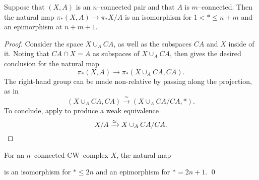 \begin{corollary}
Suppose that $(X, A)$ is an $n$--connected pair and that $A$ is $m$--connected.
Then the natural map $\pi_*(X, A) \to \pi_* X/A$ is an isomorphism for $1 < * \le n+m$ and an epimorphism at $n+m+1$.
\end{corollary}
\begin{proof}
Consider the space $X \cup_A CA$, as well as the subspaces $CA$ and $X$ inside of it.
Noting that $CA \cap X = A$ as subspaces of $X \cup_A CA$,  then gives the desired conclusion for the natural map \[\pi_*(X, A) \to \pi_*(X \cup_A CA, CA).\]
The right-hand group can be made non-relative by passing along the projection, as in \[(X \cup_A CA, CA) \xrightarrow\simeq (X \cup_A CA/CA, *).\]
To conclude, apply  to produce a weak equivalence \[X/A \xrightarrow\simeq X \cup_A CA/CA. \qedhere\]
\end{proof}

\begin{corollary}\label{FreudenthalThm}%
For an $n$--connected CW--complex $X$, the natural map
\begin{center}
\end{center}
is an isomorphism for $* \le 2n$ and an epimorphism for $* = 2n+1$. \qed
\end{corollary}

